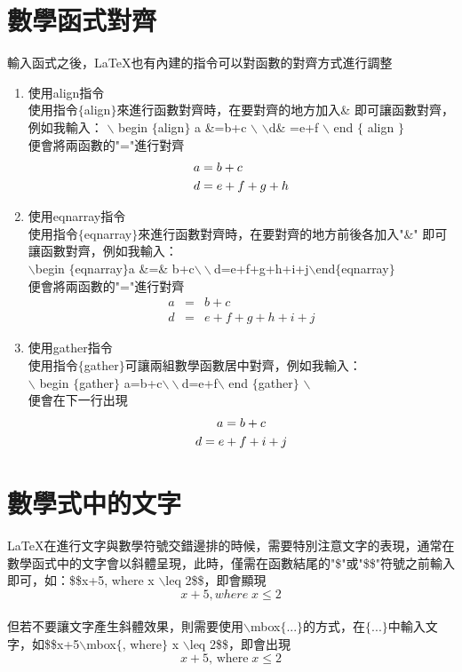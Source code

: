 \section{{數學函式對齊}}
輸入函式之後，\LaTeX 也有內建的指令可以對函數的對齊方式進行調整
\begin{enumerate}
\item 使用align指令\\
使用指令$\{$align$\}$來進行函數對齊時，在要對齊的地方加入\& 即可讓函數對齊，例如我輸入：
$\backslash$ begin $\{$align$\}$ a \&=b+c $\backslash$ $\backslash$d\& =e+f $\backslash$ end $\{$ align $\}$\\
便會將兩函數的"="進行對齊\begin{align} a &=b+c\notag\\ d &=e+f+g+h\notag 
\end{align}
\item 使用eqnarray指令\\
使用指令$\{$eqnarray$\}$來進行函數對齊時，在要對齊的地方前後各加入"\&" 即可讓函數對齊，例如我輸入：\\
$\backslash$begin $\{$eqnarray$\}$a \&=\& b+c$\backslash\backslash$d=e+f+g+h+i+j$\backslash$end$\{$eqnarray$\}$\\
便會將兩函數的"="進行對齊\begin{eqnarray}a&=&b+c\nonumber\\d&=&e+f+g+h+i+j\nonumber
\end{eqnarray}
\item 使用gather指令\\
使用指令$\{$gather$\}$可讓兩組數學函數居中對齊，例如我輸入：\\
$\backslash$ begin $\{$gather$\}$ a=b+c$\backslash\backslash$d=e+f$\backslash$ end $\{$gather$\}$ $\backslash$\\
便會在下一行出現\begin{gather}
a=b+c\notag \\ d=e+f+i+j\notag 
\end{gather}
\end{enumerate}

\section{{數學式中的文字}}
\LaTeX 在進行文字與數學符號交錯邊排的時候，需要特別注意文字的表現，通常在數學函式中的文字會以斜體呈現，此時，僅需在函數結尾的"\$"或"\$\$"符號之前輸入即可，如：\$\$x+5\;, where  x $\backslash$leq 2\$\$，即會顯現$$x+5, where \; x \leq 2$$\\
但若不要讓文字產生斜體效果，則需要使用$\backslash$mbox$\{$...$\}$的方式，在$\{...\}$中輸入文字，如\$\$x+5\;$\backslash$mbox$\{$, where$\}$  x $\backslash$leq 2\$\$，即會出現$$x+5 \mbox{, where} \; x \leq 2$$\\

